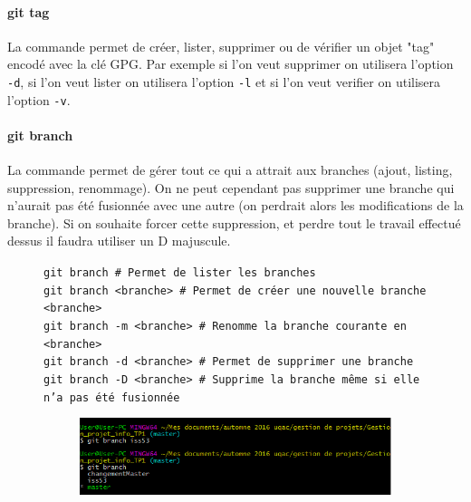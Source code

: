 \documentclass[11pt,canadien]{article}
\begin{document}
\paragraph{git tag}La commande permet de créer, lister, supprimer ou de vérifier un objet "tag" encodé avec la clé GPG. Par exemple si l'on veut supprimer on utilisera  l'option \texttt{-d}, si l'on veut lister on utilisera l'option \texttt{-l} et si l'on veut verifier on utilisera l'option \texttt{-v}.

\paragraph{git branch}La commande permet de gérer tout ce qui a attrait aux branches (ajout, listing, suppression, renommage). On ne peut cependant  pas supprimer une branche qui n'aurait pas été fusionnée avec une autre (on perdrait alors les modifications de la branche). Si on souhaite forcer cette suppression, et perdre tout le travail effectué dessus il faudra utiliser un D majuscule.
\begin{figure}[H]
	\texttt{git branch               \# Permet de lister les branches \\
			git branch <branche>     \# Permet de créer une nouvelle branche <branche> \\
			git branch -m <branche>  \# Renomme la branche courante en <branche> \\
			git branch -d <branche>  \# Permet de supprimer une branche \\
			git branch -D <branche>  \# Supprime la branche même si elle n'a pas été fusionnée
	}
	\begin{figure}[H]
		\centering
		\includegraphics{images/git_branch.png}
	\end{figure}
\end{figure}
\end{document}
